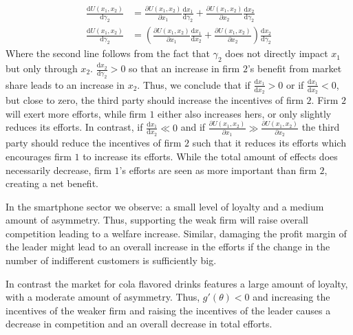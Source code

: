 \documentclass[a4paper, 11pt]{article}
\renewcommand{\d}{\text{d}}
\begin{document}
\begin{align}
\frac{\d U(x_1,x_2)}{\d \gamma_2} &= \frac{\partial U(x_1,x_2)}{\partial x_1}\frac{\d x_1}{\d \gamma_2} + \frac{\partial U(x_1,x_2)}{\partial x_2}\frac{\d x_2}{\d \gamma_2}\\
\frac{\d U(x_1,x_2)}{\d \gamma_2} &= \left(\frac{\partial U(x_1,x_2)}{\partial x_1}\frac{\d x_1}{\d x_2}+ \frac{\partial U(x_1,x_2)}{\partial x_2}\right)\frac{\d x_2}{\d \gamma_2}
\end{align}
Where the second line follows from the fact that $\gamma_2$ does not directly impact $x_1$ but only through $x_2$. $\frac{\d x_2}{\d \gamma_2}>0$ so that an increase in firm $2$'s benefit from market share leads to an increase in $x_2$. Thus, we conclude that if $\frac{\d x_1}{\d x_2}>0$ or if $\frac{\d x_1}{\d x_2}<0$, but close to zero, the third party should increase the incentives of firm $2$. Firm $2$ will exert more efforts, while firm $1$ either also increases hers, or only slightly reduces its efforts. In contrast, if $\frac{\d x_1}{\d x_2}\ll0$ and if $\frac{\partial U(x_1,x_2)}{\partial x_1}\gg \frac{\partial U(x_1,x_2)}{\partial x_2}$ the third party should reduce the incentives of firm $2$ such that it reduces its efforts which encourages firm $1$ to increase its efforts. While the total amount of effects does necessarily decrease, firm $1$'s efforts are seen as more important than firm $2$, creating a net benefit.

In the smartphone sector we observe: a small level of loyalty and a medium amount of asymmetry. Thus, supporting the weak firm will raise overall competition leading to a welfare increase. Similar, damaging the profit margin of the leader might lead to an overall increase in the efforts if the change in the number of indifferent customers is sufficiently big.

In contrast the market for cola flavored drinks features a large amount of loyalty, with a moderate amount of asymmetry. Thus, $g'(\theta)<0$ and increasing the incentives of the weaker firm and raising the incentives of the leader causes a decrease in competition and an overall decrease in total efforts. 
\end{document}
